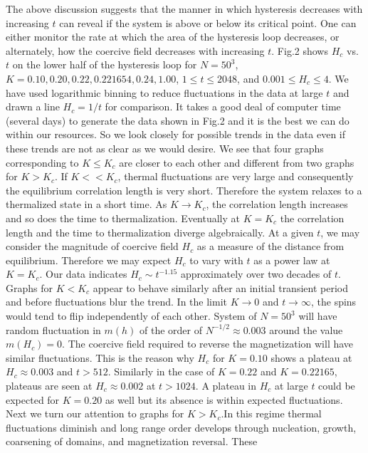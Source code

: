 \documentclass[a4,aps,amsmath,floatfix,nofootinbib,10pt]{revtex4}
\begin{document}
The above discussion suggests that the manner in which hysteresis 
decreases with increasing $t$ can reveal if the system is above or 
below its critical point. One can either monitor the rate at which the 
area of the hysteresis loop decreases, or alternately, how the coercive 
field decreases with increasing $t$. Fig.2 shows $H_c$ vs. $t$ on the 
lower half of the hysteresis loop for $N=50^3$, $K = 0.10, 0.20, 0.22, 
0.221654, 0.24, 1.00$, $1 \le t \le 2048$, and $0.001 \le H_c \le 4$. 
We have used logarithmic binning to reduce fluctuations in the data at 
large $t$ and drawn a line $H_c=1/t$ for comparison. It takes a good 
deal of computer time (several days) to generate the data shown in 
Fig.2 and it is the best we can do within our resources. So we look 
closely for possible trends in the data even if these trends are not as 
clear as we would desire. We see that four graphs corresponding to $K 
\le K_c$ are closer to each other and different from two graphs for $K 
> K_c$. If $K << K_c$, thermal fluctuations are very 
large and consequently the equilibrium correlation length is very 
short. Therefore the system relaxes to a thermalized state in a short 
time. As $K \to K_c$, the correlation length increases and so does the 
time to thermalization. Eventually at $K=K_c$ the correlation length 
and the time to thermalization diverge algebraically. At a given $t$, 
we may consider the magnitude of coercive field $H_c$ as a measure of 
the distance from equilibrium. Therefore we may expect $H_c$ to vary 
with $t$ as a power law at $K=K_c$. Our data indicates $H_c \sim 
t^{-1.15}$ approximately over two decades of $t$. Graphs for $K < K_c$ 
appear to behave similarly after an initial transient period and before 
fluctuations blur the trend. In the limit $K \to 0$ and $t \to \infty$, 
the spins would tend to flip independently of each other. System of 
$N=50^3$ will have random fluctuation in $m(h)$ of the order of 
$N^{-1/2} \approx 0.003$ around the value $m(H_c)=0$. The coercive 
field required to reverse the magnetization will have similar 
fluctuations. This is the reason why $H_c$ for $K=0.10$ shows a plateau 
at $H_c \approx 0.003$ and $t > 512$. Similarly in the case of $K=0.22$ 
and $K=0.22165$, plateaus are seen at $H_c \approx 0.002$ at $t > 
1024$. A plateau in $H_c$ at large $t$ could be expected for $K=0.20$ 
as well but its absence is within expected fluctuations. Next we turn 
our attention to graphs for $K > K_c$.In this regime thermal 
fluctuations diminish and long range order develops through nucleation, 
growth, coarsening of domains, and magnetization reversal. These 
\end{document}
